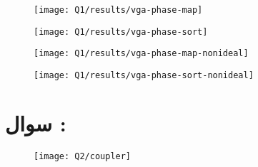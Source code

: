 \documentclass[12pt,onecolumn,a4paper]{article}
\newcommand\question[1][\space]{
	\section[سوال \tartibi{section}]
	{سوال \tartibi{section}: #1}
}
\begin{document}
\begin{figure}[H]
	\centering
	\texttt{[image: Q1/results/vga-phase-map]}
	\caption{}
	\label{fig:vga-phase-map}
\end{figure}
\begin{figure}[H]
	\centering
	\texttt{[image: Q1/results/vga-phase-sort]}
	\caption{}
	\label{fig:vga-phase-sort}
\end{figure}









\begin{figure}[H]
	\centering
	\texttt{[image: Q1/results/vga-phase-map-nonideal]}
	\caption{}
	\label{fig:vga-phase-map-nonideal}
\end{figure}
\begin{figure}[H]
	\centering
	\texttt{[image: Q1/results/vga-phase-sort-nonideal]}
	\caption{}
	\label{fig:vga-phase-sort-nonideal}
\end{figure}





\FloatBarrier\question[]%

\def\fo{30e9}%
\def\Cl{256e-15}%



\begin{figure}[H]
	\centering
	\texttt{[image: Q2/coupler]}
	\caption{}
	\label{fig:coupler}
\end{figure}



\end{document}

